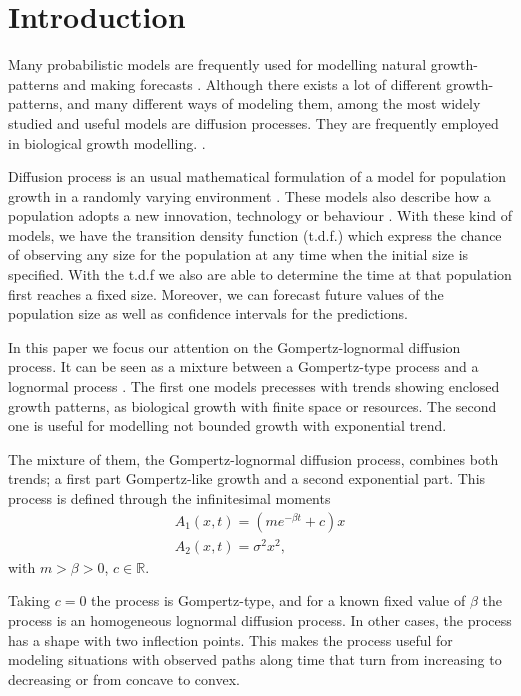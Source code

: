 \documentclass{sig-alternate}
\begin{document}
\section{Introduction}

Many probabilistic models are frequently used for modelling natural
growth-patterns and making forecasts %
. Although there exists a lot of
different growth-patterns, and many different ways of modeling them,
among the most widely
studied and useful models are diffusion processes. %
 They are frequently
employed in biological growth modelling. \cite{lognormal}. 

Diffusion process is an usual mathematical formulation of a model for population growth in a randomly
varying environment \cite{lognormal}. %
 These models also describe how a population adopts a new innovation, technology or behaviour \cite{Myrskyla2013}. With these kind of models, we have the transition density function (t.d.f.) which express the chance of observing
any size for the population at any time when the initial size is specified. With the t.d.f we also are able to determine the time at that population first reaches a fixed size. Moreover, we can forecast future values of the population size as well as confidence intervals for the predictions.

In this paper we focus our attention on the Gompertz-lognormal diffusion process. It can be seen as a mixture between a Gompertz-type process \cite{Gut07b} and a lognormal process \cite{GutCy}. The first one models precesses with trends showing enclosed growth patterns, as biological growth with finite space or resources. The second one is useful for modelling not bounded growth with exponential trend.

The mixture of them, the Gompertz-lognormal diffusion process, combines both trends; a first part Gompertz-like growth and a second exponential part. This process is defined through the infinitesimal moments
\[
\begin{array}{l}
A_1(x,t)=(m e^{-\beta t}+c)x \\
A_2(x,t)=\sigma^2 x^2,
\end{array}
\]
with $m > \beta > 0$, $c\in \mathbb{R}$.

Taking $c=0$ the process is Gompertz-type, and for a known fixed value of $\beta$ the process is an homogeneous lognormal diffusion process. In other cases, the process has a shape with two inflection points. This makes the process useful for modeling situations with observed paths along time that turn from increasing to decreasing or from concave to convex.
\end{document}
